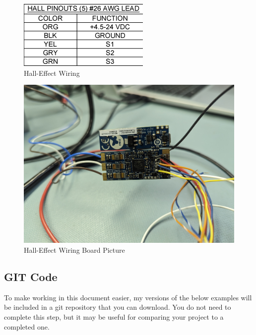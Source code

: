 \documentclass[10pt]{article}
\begin{document}
            \begin{figure}[H]
                \centerline{\includegraphics[width=\textwidth]{References/Hall-Effect Wiring.png}}
                \caption{Hall-Effect Wiring}
            \end{figure}
            \begin{figure}[H]
                \centerline{\includegraphics[width=\textwidth]{References/Hall-Effect Wiring Board Picture.jpg}}
                \caption{Hall-Effect Wiring Board Picture}
            \end{figure}
		\FloatBarrier \subsection{GIT Code}
            To make working in this document easier, my versions of the below examples will be included in a git repository that you can download. You do not need to complete this step, but it may be useful for comparing your project to a completed one. \\
\end{document}
